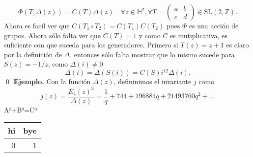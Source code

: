 \documentclass[letterpaper]{article}
\newcommand{\eje}{{\newline \noindent \sc \textbf{Ejemplo. }}}
\newcommand{\hd}{\ensuremath{\mathbb H^2}}
\newcommand{\slz}{\ensuremath{\mathrm{SL}(2,\mathbb Z) }}
\begin{document}
\[
    \Phi(T,\Delta(z))=C(T)\Delta(z)\quad\forall z\in\hd,\forall T=\begin{pmatrix}a & b\\ c & d \end{pmatrix}\in\slz.
\]
Ahora es facil ver que \(C(T_1\circ T_2)=C(T_1)C(T_2)\) pues \(\Phi\) es una acción de grupos. Ahora sólo falta ver que \(C(T)=1\) y como \(C\) es mutiplicativa, es suficiente con que suceda para los generadores. Primero si \(T(z)=z+1\) es claro por la definición de \(\Delta\), entonces sólo falta mostrar que lo mismo sucede para \(S(z)=-1/z\), como \(\Delta(i)\neq0\)
\[
\Delta(i)=\Delta(S(i))=C(S)i^{12}\Delta(i).
\]
\qed
\eje Con la función \(\Delta(z)\), defininimos el invariante \(j\) como
\[
j(z)=\frac{E_4(z)^3}{\Delta(z)}=\frac{1}{q}+744+196884q+21493760q^2+\dots
\]
A³+B³=C³
\begin{center}
\begin{tabular}{rr}
hi & bye\\
\hline
0 & 1\\
\end{tabular}
\end{center}
\end{document}
